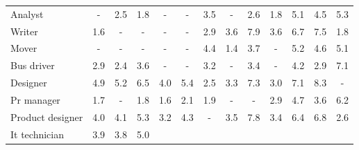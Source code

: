 \begin{table*}[p]
{\begin{tabular}{l|ccc|ccc|ccc|ccc}
Analyst
& \cellcolor{lightgray} - & \cellcolor{blue1} 2.5 & \cellcolor{blue1} 1.8
& \cellcolor{lightgray} - & \cellcolor{lightgray} - & \cellcolor{blue1} 3.5
& \cellcolor{lightgray} - & \cellcolor{orange1} 2.6 & \cellcolor{blue1} 1.8
& \cellcolor{orange2} 5.1 & \cellcolor{orange2} 4.5 & \cellcolor{blue2} 5.3
\\
Writer
& \cellcolor{orange1} 1.6 & \cellcolor{lightgray} - & \cellcolor{lightgray} -
& \cellcolor{lightgray} - & \cellcolor{lightgray} - & \cellcolor{blue1} 2.9
& \cellcolor{orange1} 3.6 & \cellcolor{orange3} 7.9 & \cellcolor{orange1} 3.6
& \cellcolor{orange3} 6.7 & \cellcolor{orange3} 7.5 & \cellcolor{blue1} 1.8
\\
Mover
& \cellcolor{lightgray} - & \cellcolor{lightgray} - & \cellcolor{lightgray} -
& \cellcolor{lightgray} - & \cellcolor{lightgray} - & \cellcolor{blue2} 4.4
& \cellcolor{orange1} 1.4 & \cellcolor{orange1} 3.7 & \cellcolor{lightgray} -
& \cellcolor{orange2} 5.2 & \cellcolor{orange2} 4.6 & \cellcolor{blue2} 5.1
\\
Bus driver
& \cellcolor{orange1} 2.9 & \cellcolor{orange1} 2.4 & \cellcolor{orange1} 3.6
& \cellcolor{lightgray} - & \cellcolor{lightgray} - & \cellcolor{blue1} 3.2
& \cellcolor{lightgray} - & \cellcolor{orange1} 3.4 & \cellcolor{lightgray} -
& \cellcolor{orange2} 4.2 & \cellcolor{orange1} 2.9 & \cellcolor{blue3} 7.1
\\
Designer
& \cellcolor{orange2} 4.9 & \cellcolor{orange2} 5.2 & \cellcolor{orange2} 6.5
& \cellcolor{orange2} 4.0 & \cellcolor{orange2} 5.4 & \cellcolor{orange1} 2.5
& \cellcolor{orange1} 3.3 & \cellcolor{orange3} 7.3 & \cellcolor{orange1} 3.0
& \cellcolor{orange3} 7.1 & \cellcolor{orange3} 8.3 & \cellcolor{lightgray} -
\\
Pr manager
& \cellcolor{orange1} 1.7 & \cellcolor{lightgray} - & \cellcolor{orange1} 1.8
& \cellcolor{orange1} 1.6 & \cellcolor{orange1} 2.1 & \cellcolor{blue1} 1.9
& \cellcolor{lightgray} - & \cellcolor{lightgray} - & \cellcolor{blue1} 2.9
& \cellcolor{orange2} 4.7 & \cellcolor{orange1} 3.6 & \cellcolor{blue2} 6.2
\\
Product designer
& \cellcolor{orange2} 4.0 & \cellcolor{orange2} 4.1 & \cellcolor{orange2} 5.3
& \cellcolor{orange1} 3.2 & \cellcolor{orange2} 4.3 & \cellcolor{lightgray} -
& \cellcolor{orange1} 3.5 & \cellcolor{orange3} 7.8 & \cellcolor{orange1} 3.4
& \cellcolor{orange2} 6.4 & \cellcolor{orange3} 6.8 & \cellcolor{blue1} 2.6
\\
It technician
& \cellcolor{orange2} 3.9 & \cellcolor{orange1} 3.8 & \cellcolor{orange2} 5.0

\end{tabular}}
\end{table*}
